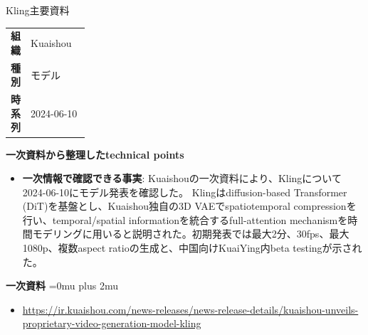 \begin{technicalnote}{Kling}{主要資料}
\begingroup
\begin{tabularx}{\linewidth}{@{}>{\bfseries}p{0.22\linewidth}X@{}}
組織 & Kuaishou \\
種別 & モデル \\
時系列 & 2024-06-10 \\
\end{tabularx}
\smallskip
\begin{minipage}{\linewidth}
{\bfseries 一次資料から整理したtechnical points}
\begin{itemize}[leftmargin=1.5em,itemsep=0.35em]
\item \textbf{一次情報で確認できる事実}: Kuaishouの一次資料により、Klingについて2024-06-10にモデル発表を確認した。 Klingはdiffusion-based Transformer (DiT)を基盤とし、Kuaishou独自の3D VAEでspatiotemporal compressionを行い、temporal/spatial informationを統合するfull-attention mechanismを時間モデリングに用いると説明された。初期発表では最大2分、30fps、最大1080p、複数aspect ratioの生成と、中国向けKuaiYing内beta testingが示された。
\end{itemize}
\begin{minipage}{\linewidth}
\begin{samepage}
{\bfseries 一次資料}
\begingroup\sloppy
\Urlmuskip=0mu plus 2mu\relax
\begin{itemize}[leftmargin=1.5em,itemsep=0.25em]
\item {\scriptsize\url{https://ir.kuaishou.com/news-releases/news-release-details/kuaishou-unveils-proprietary-video-generation-model-kling}}
\end{itemize}
\endgroup
\end{samepage}
\end{minipage}
\end{minipage}
\endgroup
\end{technicalnote}
\medskip


